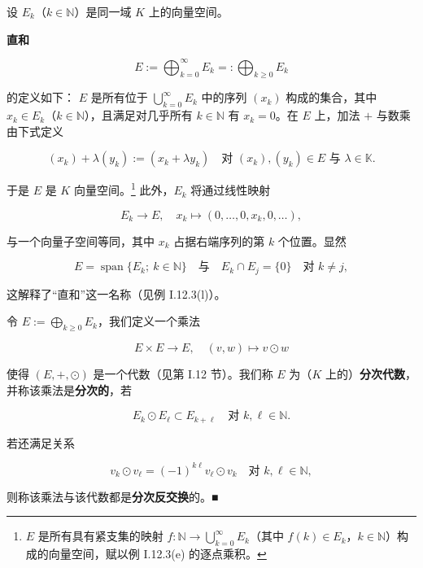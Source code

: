 \begin{remark}

设 $ E_{k} $（$ k \in \mathbb{N} $）是同一域 $ K $ 上的向量空间。

\begin{items}
\item

\textbf{直和}

\[
E := \bigoplus_{k=0}^{\infty}E_{k} =: \bigoplus_{k\ge 0}E_{k}
\]

的定义如下：
$ E $ 是所有位于 $ \bigcup_{k=0}^{\infty}E_{k} $ 中的序列 $ (x_{k}) $ 构成的集合，其中 $ x_{k} \in E_{k} $（$ k \in \mathbb{N} $），且满足对几乎所有 $ k \in \mathbb{N} $ 有 $ x_{k} = 0 $。在 $ E $ 上，加法 $ + $ 与数乘由下式定义

\[
(x_{k}) + \lambda(y_{k}) := (x_{k} + \lambda y_{k}) \quad \text{对 } (x_{k}),(y_{k}) \in E \text{ 与 } \lambda \in \mathbb{K}.
\]

于是 $ E $ 是 $ K $ 向量空间。\footnote{$ E $ 是所有具有紧支集的映射 $ f:\mathbb{N} \to \bigcup_{k=0}^{\infty}E_{k} $（其中 $ f(k) \in E_{k} $，$ k \in \mathbb{N} $）构成的向量空间，赋以例 I.12.3(e) 的逐点乘积。} 此外，$ E_{k} $ 将通过线性映射

\[
E_{k} \to E, \quad x_{k} \mapsto (0,\ldots,0,x_{k},0,\ldots),
\]

与一个向量子空间等同，其中 $ x_{k} $ 占据右端序列的第 $ k $ 个位置。显然

\[
E = \operatorname{span}\{E_{k} ;\ k \in \mathbb{N}\} \quad \text{与} \quad E_{k}\cap E_{j} = \{0\} \quad \text{对 } k \ne j,
\]

这解释了“直和”这一名称（见例 I.12.3(l)）。

\item

令 $ E := \bigoplus_{k\ge 0}E_{k} $，我们定义一个乘法

\[
E\times E \to E, \quad (v,w) \mapsto v\odot w
\]

使得 $ (E,+,\odot) $ 是一个代数（见第 I.12 节）。我们称 $ E $ 为（$ K $ 上的）\textbf{分次代数}，并称该乘法是\textbf{分次的}，若

\[
E_{k}\odot E_{\ell} \subset E_{k+\ell} \quad \text{对 } k,\ell \in \mathbb{N}.
\]

若还满足关系

\[
v_{k}\odot v_{\ell} = (-1)^{k\ell}v_{\ell}\odot v_{k} \quad \text{对 } k,\ell \in \mathbb{N},
\]

则称该乘法与该代数都是\textbf{分次反交换}的。\nobreak\hspace{0.35em}■


\end{items}
\end{remark}
